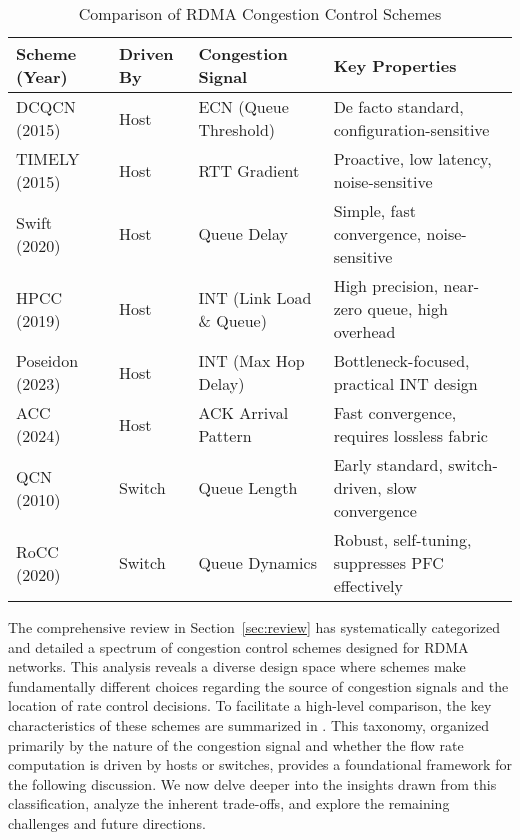 \documentclass[11pt,en]{elegantpaper}
\begin{document}
\begin{table}[!htb]
    \centering
    \caption{Comparison of RDMA Congestion Control Schemes}
    \begin{tabular}{l|l|l|l}
        \toprule
        \textbf{Scheme (Year)} & \textbf{Driven By} & \textbf{Congestion Signal} & \textbf{Key Properties} \\
        \midrule
        DCQCN~\cite{dcqcn} (2015) & Host & ECN (Queue Threshold) & De facto standard, configuration-sensitive \\
        \hline
        TIMELY~\cite{timely} (2015) & Host & RTT Gradient & Proactive, low latency, noise-sensitive \\
        \hline
        Swift~\cite{swift} (2020) & Host & Queue Delay & Simple, fast convergence, noise-sensitive \\
        \hline
        HPCC~\cite{hpcc} (2019) & Host & INT (Link Load \& Queue) & High precision, near-zero queue, high overhead \\
        \hline
        Poseidon~\cite{poseidon} (2023) & Host & INT (Max Hop Delay) & Bottleneck-focused, practical INT design \\
        \hline
        ACC~\cite{acc} (2024) & Host & ACK Arrival Pattern & Fast convergence, requires lossless fabric \\
        \hline
        QCN~\cite{qcn} (2010) & Switch & Queue Length & Early standard, switch-driven, slow convergence \\
        \hline
        RoCC~\cite{rocc} (2020) & Switch & Queue Dynamics & Robust, self-tuning, suppresses PFC effectively \\
        \bottomrule 
    \end{tabular}
    \label{tab:scheme_comparison}
\end{table}
The comprehensive review in Section~\ref{sec:review} has systematically categorized and detailed a spectrum of congestion control schemes designed for RDMA networks. This analysis reveals a diverse design space where schemes make fundamentally different choices regarding the source of congestion signals and the location of rate control decisions. To facilitate a high-level comparison, the key characteristics of these schemes are summarized in . This taxonomy, organized primarily by the nature of the congestion signal and whether the flow rate computation is driven by hosts or switches, provides a foundational framework for the following discussion. We now delve deeper into the insights drawn from this classification, analyze the inherent trade-offs, and explore the remaining challenges and future directions.
\end{document}
